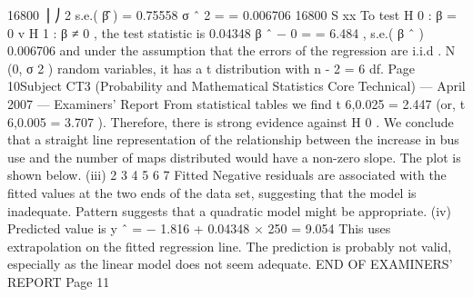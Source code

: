 16800 ⎟ ⎠
2
s.e.( β̂ ) =
0.75558
σ ˆ 2
=
= 0.006706
16800
S xx
To test H 0 : β = 0 v H 1 : β ≠ 0 , the test statistic is
0.04348
β ˆ − 0
=
= 6.484 ,
s.e.( β ˆ ) 0.006706
and under the assumption that the errors of the regression are i.i.d . N (0, σ 2 )
random variables, it has a t distribution with n - 2 = 6 df.
Page 10Subject CT3 (Probability and Mathematical Statistics Core Technical) — April 2007 — Examiners’ Report
From statistical tables we find t 6,0.025 = 2.447 (or, t 6,0.005 = 3.707 ).
Therefore, there is strong evidence against H 0 . We conclude that a straight
line representation of the relationship between the increase in bus use and the
number of maps distributed would have a non-zero slope.
The plot is shown below.
(iii)
2
3
4
5
6
7
Fitted
Negative residuals are associated with the fitted values at the two ends of the
data set, suggesting that the model is inadequate. Pattern suggests that a
quadratic model might be appropriate.
(iv)
Predicted value is y ˆ = − 1.816 + 0.04348 × 250 = 9.054
This uses extrapolation on the fitted regression line. The prediction is probably
not valid, especially as the linear model does not seem adequate.
END OF EXAMINERS’ REPORT
Page 11
